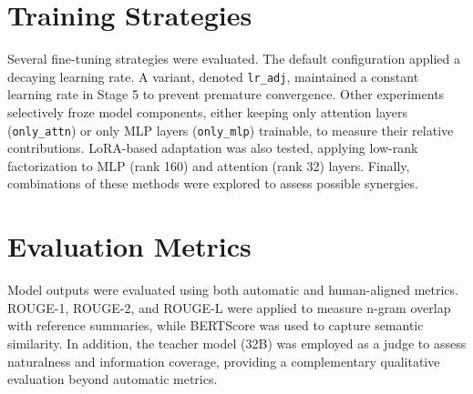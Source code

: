 {
    \label{tab:dataset_statistics}
    \centering
}

\section{Training Strategies}
Several fine-tuning strategies were evaluated. The default configuration applied a decaying learning rate. A variant, denoted \texttt{lr\_adj}, maintained a constant learning rate in Stage 5 to prevent premature convergence. Other experiments selectively froze model components, either keeping only attention layers (\texttt{only\_attn}) or only MLP layers (\texttt{only\_mlp}) trainable, to measure their relative contributions. LoRA-based adaptation was also tested, applying low-rank factorization to MLP (rank 160) and attention (rank 32) layers. Finally, combinations of these methods were explored to assess possible synergies.

\section{Evaluation Metrics}
Model outputs were evaluated using both automatic and human-aligned metrics. ROUGE-1, ROUGE-2, and ROUGE-L were applied to measure n-gram overlap with reference summaries, while BERTScore was used to capture semantic similarity. In addition, the teacher model (32B) was employed as a judge to assess naturalness and information coverage, providing a complementary qualitative evaluation beyond automatic metrics.
